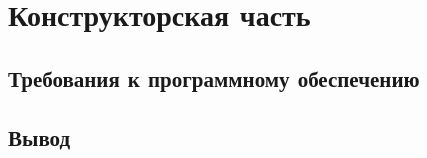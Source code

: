 \section{Конструкторская часть}


\subsection{Требования к программному обеспечению}


\subsection*{Вывод}

